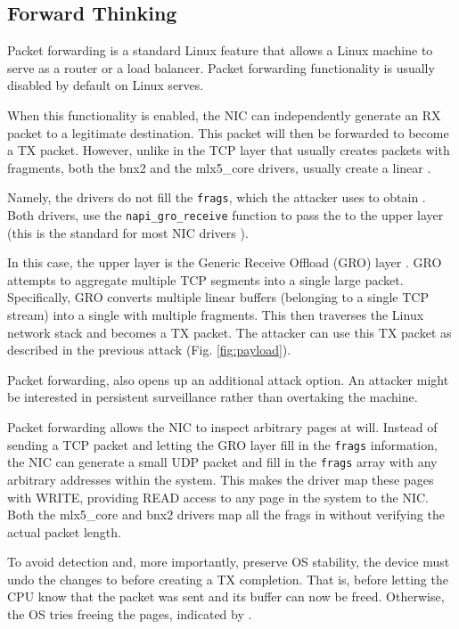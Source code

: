 \subsection{Forward Thinking}\label{sec:forward}

Packet forwarding is a standard Linux feature that allows a Linux machine to serve as a router or a load balancer. Packet forwarding functionality is usually disabled by default on Linux serves.

When this functionality is enabled, the NIC can independently generate an RX packet to a legitimate destination. This packet will then be forwarded to become a TX packet. However, unlike in the TCP layer that usually creates \skb{} packets with fragments, both the bnx2 and the mlx5\_core drivers, usually create a linear \skb{}.

Namely, the drivers do not fill the \texttt{frags}, which the attacker uses to obtain \means{}. Both drivers, use the \texttt{napi\_gro\_receive} function to pass the \skb{} to the upper layer (this is the standard for most NIC drivers ). 

In this case, the upper layer is the Generic Receive Offload (GRO) layer \cite{gro}. GRO attempts to aggregate multiple TCP segments into a single large packet. Specifically, GRO converts multiple linear \skb{} buffers (belonging to a single TCP stream) into a single \skb{} with multiple fragments. This \skb{} then traverses the Linux network stack and becomes a TX packet. The attacker can use this TX packet as described in the previous attack (Fig. \ref{fig:payload}).

Packet forwarding, also opens up an additional attack option. An attacker might be interested in persistent surveillance rather than overtaking the machine. 

Packet forwarding allows the NIC to inspect arbitrary pages at will. 
Instead of sending a TCP packet and letting the GRO layer fill in the \texttt{frags} information, the NIC can generate a small UDP packet and fill in the \texttt{frags} array with any arbitrary \page{} addresses within the system. This makes the driver map these pages with WRITE, providing READ access to any page in the system to the NIC. Both the mlx5\_core and bnx2 drivers map all the frags in \shinfo{} without verifying the actual packet length.

To avoid detection and, more importantly, preserve OS stability, the device must undo the changes to \shinfo{} before creating a TX completion. That is, before letting the CPU know that the packet was sent and its buffer can now be freed. Otherwise, the OS tries freeing the pages, indicated by \shinfo.

